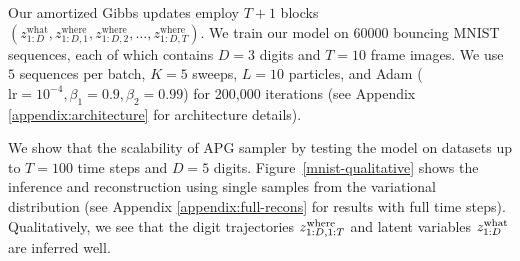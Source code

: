 \documentclass{article}
\theoremstyle{definition}
\begin{document}
Our amortized Gibbs updates employ $T + 1$ blocks $(z_{1:D}^{\mathrm{what}}, z_{1:D, 1}^{\mathrm{where}}, z_{1:D, 2}^{\mathrm{where}}, \dotsc, z_{1:D, T}^{\mathrm{where}})$.
We train our model on 60000 bouncing MNIST sequences, each of which contains $D=3$ digits and $T=10$ frame images. We use $5$ sequences per batch, $K=5$ sweeps, $L=10$ particles, and Adam ($\mathrm{lr} = 10^{-4}, \beta_1 = 0.9, \beta_2 = 0.99$) for 200,000 iterations (see Appendix \ref{appendix:architecture} for architecture details).

We show that the scalability of APG sampler by testing the model on datasets up to $T=100$ time steps and $D=5$ digits. Figure~\ref{mnist-qualitative} shows the inference and reconstruction using single samples from the variational distribution (see Appendix \ref{appendix:full-recons} for results with full time steps). 
Qualitatively, we see that the digit trajectories $z_{1:D, 1:T}^{\mathrm{where}}$ and latent variables $z_{1:D}^{\mathrm{what}}$ are inferred well.
\end{document}
